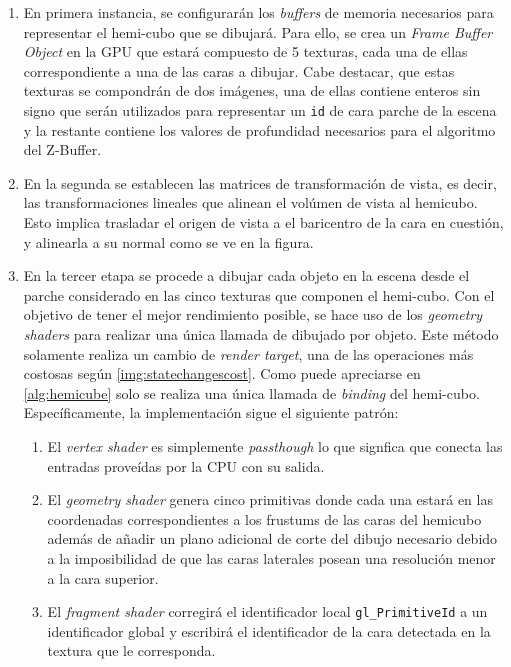 \begin{enumerate}
	\item En primera instancia, se configurarán los \textit{buffers} de memoria necesarios para representar el hemi-cubo que se dibujará.
	Para ello, se crea un \textit{Frame Buffer Object} en la GPU que estará compuesto de 5 texturas, cada una de ellas correspondiente a una de las caras a dibujar. Cabe destacar, que estas texturas se compondrán de dos imágenes, una de ellas contiene enteros sin signo que serán utilizados para representar un \verb|id| de cara parche de la escena y la restante contiene los valores de profundidad necesarios para el algoritmo del Z-Buffer.
	\item En la segunda se establecen las matrices de transformación de vista, es decir, las transformaciones lineales que alinean el volúmen de vista al hemicubo. Esto implica trasladar el origen de vista a el baricentro de la cara en cuestión, y alinearla a su normal como se ve en la figura.
	\item En la tercer etapa se procede a dibujar cada objeto en la escena desde el parche considerado en las cinco texturas que componen el hemi-cubo. Con el objetivo de tener el mejor rendimiento posible, se hace uso de los \textit{geometry shaders} para realizar una única llamada de dibujado por objeto. Este método solamente realiza un cambio de \textit{render target}, una de las operaciones más costosas según \ref{img:statechangescost}. Como puede apreciarse en \ref{alg:hemicube} solo se realiza una única llamada de \textit{binding} del hemi-cubo. Específicamente, la implementación sigue el siguiente patrón:
	\begin{enumerate}
		\item El \textit{vertex shader} es simplemente \textit{passthough} lo que signfica que conecta las entradas proveídas por la CPU con su salida.
		\item El \textit{geometry shader} genera cinco primitivas donde cada una estará en las coordenadas correspondientes a los frustums de las caras del hemicubo además de añadir un plano adicional de corte del dibujo necesario debido a la imposibilidad de que las caras laterales posean una resolución menor a la cara superior.
		\item El \textit{fragment shader} corregirá el identificador local \verb|gl_PrimitiveId| a un identificador global y escribirá el identificador de la cara detectada en la textura que le corresponda.
	\end{enumerate}
 \end{enumerate}

